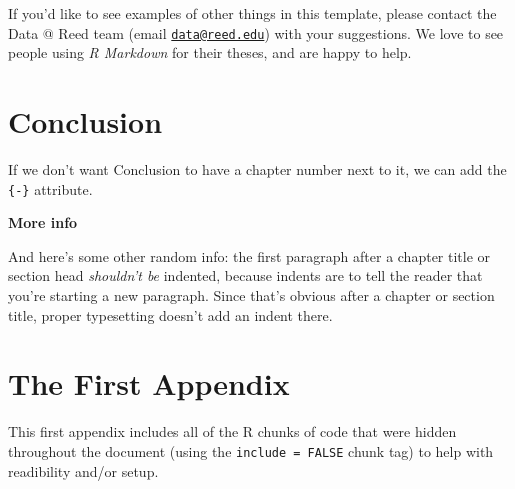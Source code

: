 \documentclass[12pt,twoside]{reedthesis}
\begin{document}
If you'd like to see examples of other things in this template, please contact the Data @ Reed team (email \href{mailto:data@reed.edu}{\nolinkurl{data@reed.edu}}) with your suggestions. We love to see people using \emph{R Markdown} for their theses, and are happy to help.

\chapter*{Conclusion}\label{conclusion}

If we don't want Conclusion to have a chapter number next to it, we can add the \texttt{\{-\}} attribute.

\textbf{More info}

And here's some other random info: the first paragraph after a chapter title or section head \emph{shouldn't be} indented, because indents are to tell the reader that you're starting a new paragraph. Since that's obvious after a chapter or section title, proper typesetting doesn't add an indent there.

\appendix

\chapter{The First Appendix}\label{the-first-appendix}

This first appendix includes all of the R chunks of code that were hidden throughout the document (using the \texttt{include\ =\ FALSE} chunk tag) to help with readibility and/or setup.
\end{document}
